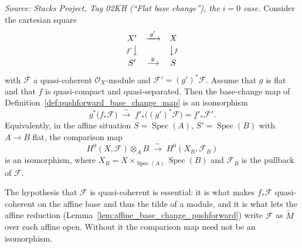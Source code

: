 \begin{theorem}\leanok
[Flat base change, $i=0$ case]
  \label{thm:flat_base_change_pushforward}
  \textit{Source: Stacks Project, Tag 02KH (``Flat base change''), the
  \(i = 0\) case.}
  Consider the cartesian square
  \[
    \begin{array}{ccc}
      X' & \xrightarrow{\;g'\;} & X \\[2pt]
      {\scriptstyle f'}\big\downarrow & & \big\downarrow{\scriptstyle f} \\[2pt]
      S' & \xrightarrow{\;g\;} & S
    \end{array}
  \]
  with \(\mathcal{F}\) a quasi-coherent \(\mathcal{O}_X\)-module and
  \(\mathcal{F}' = (g')^*\mathcal{F}\). Assume that \(g\) is flat and that \(f\)
  is quasi-compact and quasi-separated. Then the base-change map of
  Definition~\ref{def:pushforward_base_change_map} is an isomorphism
  \[
    g^*\bigl(f_*\mathcal{F}\bigr) \;\xrightarrow{\;\sim\;}\;
    f'_*\bigl((g')^*\mathcal{F}\bigr) = f'_*\mathcal{F}' .
  \]
  Equivalently, in the affine situation \(S = \operatorname{Spec}(A)\),
  \(S' = \operatorname{Spec}(B)\) with \(A \to B\) flat, the comparison map
  \[
    H^0(X, \mathcal{F}) \otimes_A B \;\xrightarrow{\;\sim\;}\;
    H^0(X_B, \mathcal{F}_B)
  \]
  is an isomorphism, where \(X_B = X \times_{\operatorname{Spec}(A)}
  \operatorname{Spec}(B)\) and \(\mathcal{F}_B\) is the pullback of
  \(\mathcal{F}\).

  The hypothesis that \(\mathcal{F}\) is quasi-coherent is essential: it is what
  makes \(f_*\mathcal{F}\) quasi-coherent on the affine base and thus the tilde of
  a module, and it is what lets the affine reduction
  (Lemma~\ref{lem:affine_base_change_pushforward}) write \(\mathcal{F}\) as
  \(\widetilde{M}\) over each affine open. Without it the comparison map need not be
  an isomorphism.
\end{theorem}

